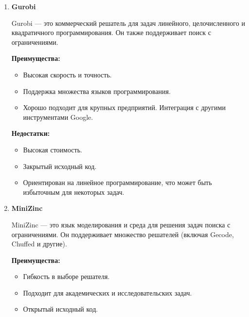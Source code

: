 \begin{enumerate}
\vspace{3mm}
\aim
\vspace{3mm}

\item \noindent \textbf {Gurobi}

Gurobi — это коммерческий решатель для задач линейного, целочисленного и квадратичного программирования. Он также поддерживает поиск с ограничениями.
\vspace{3mm}
\aim
\vspace{3mm} 

\noindent \textbf{Преимущества:}
\begin{itemize}
    \item Высокая скорость и точность.
    \item Поддержка множества языков программирования.
    \item Хорошо подходит для крупных предприятий.
Интеграция с другими инструментами Google.
\end{itemize}

\vspace{3mm}
\aim
\vspace{3mm}

\noindent \textbf{Недостатки:}
\begin{itemize}
\item Высокая стоимость.
\item Закрытый исходный код.
\item Ориентирован на линейное программирование, что может быть избыточным для некоторых задач.
\end{itemize}

\vspace{3mm}
\aim
\vspace{3mm}

\item \noindent \textbf{MiniZinc}

MiniZinc — это язык моделирования и среда для решения задач поиска с ограничениями. Он поддерживает множество решателей (включая Gecode, Chuffed и другие).
\vspace{3mm}
\aim
\vspace{3mm} 

\noindent \textbf{Преимущества:}
\begin{itemize}
    \item Гибкость в выборе решателя.
    \item Подходит для академических и исследовательских задач.
    \item Открытый исходный код.
\end{itemize}


\end{enumerate}
